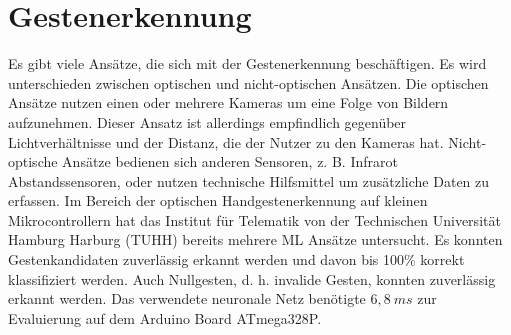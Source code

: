 \chapter{Gestenerkennung}
Es gibt viele Ansätze, die sich mit der Gestenerkennung beschäftigen. Es wird unterschieden zwischen optischen und nicht-optischen Ansätzen. Die optischen Ansätze nutzen einen
oder mehrere Kameras um eine Folge von Bildern aufzunehmen. Dieser Ansatz ist allerdings empfindlich gegenüber Lichtverhältnisse und der Distanz, die der
Nutzer zu den Kameras hat. Nicht-optische Ansätze bedienen sich anderen Sensoren, z. B. Infrarot Abstandssensoren, oder nutzen technische Hilfsmittel um zusätzliche Daten zu erfassen.
\newline
\newline
Im Bereich der optischen Handgestenerkennung auf kleinen Mikrocontrollern hat das Institut für Telematik von der Technischen Universität Hamburg Harburg (TUHH) bereits mehrere ML Ansätze untersucht.
Es konnten Gestenkandidaten zuverlässig erkannt werden und davon bis 100\% korrekt klassifiziert werden. Auch Nullgesten, d. h. invalide Gesten, konnten zuverlässig erkannt werden. Das verwendete neuronale Netz
benötigte $6,8\ ms$ zur Evaluierung auf dem Arduino Board ATmega328P.


